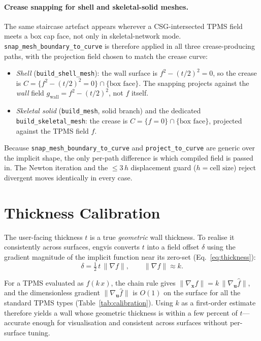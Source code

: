 \documentclass[11pt]{article}
\begin{document}
\paragraph{Crease snapping for shell and skeletal-solid meshes.}
The same staircase artefact appears wherever a CSG-intersected TPMS
field meets a box cap face, not only in skeletal-network mode.
\texttt{snap\_mesh\_boundary\_to\_curve} is therefore applied in all
three crease-producing paths, with the projection field chosen to
match the crease curve:
\begin{itemize}[leftmargin=2em]
  \item \emph{Shell} (\texttt{build\_shell\_mesh}): the wall surface is
        $f^2 - (t/2)^2 = 0$, so the crease is
        $C = \{f^2 - (t/2)^2 = 0\} \cap \{\text{box face}\}$.  The
        snapping projects against the \emph{wall} field
        $g_{\text{wall}} = f^2 - (t/2)^2$, not $f$ itself.
  \item \emph{Skeletal solid} (\texttt{build\_mesh}, solid branch) and
        the dedicated \texttt{build\_skeletal\_mesh}: the crease is
        $C = \{f = 0\} \cap \{\text{box face}\}$, projected against the
        TPMS field $f$.
\end{itemize}
Because \texttt{snap\_mesh\_boundary\_to\_curve} and
\texttt{project\_to\_curve} are generic over the implicit shape, the
only per-path difference is which compiled field is passed in.  The
Newton iteration and the $\le 3\,h$ displacement guard
($h = \text{cell size}$) reject divergent moves identically in every
case.

\section{Thickness Calibration}\label{sec:calibration}

The user-facing thickness $t$ is a true \emph{geometric} wall
thickness.  To realise it consistently across surfaces, engvis
converts $t$ into a field offset $\delta$ using the gradient magnitude
of the implicit function near its zero-set (Eq.~\ref{eq:thickness}):
\begin{equation}
  \delta = \tfrac{1}{2}\, t \, \|\nabla f\|,
  \qquad \|\nabla f\| \approx k.
\end{equation}

For a TPMS evaluated as $f(k\,x)$, the chain rule gives
$\|\nabla_{\mathbf{x}} f\| = k \,\|\nabla_{\mathbf{u}} \hat f\|$, and
the dimensionless gradient $\|\nabla_{\mathbf{u}}\hat f\|$ is $O(1)$
on the surface for all the standard TPMS types
(Table~\ref{tab:calibration}).  Using $k$ as a first-order
estimate therefore yields a wall whose geometric thickness is within a
few percent of $t$---accurate enough for visualisation and consistent
across surfaces without per-surface tuning.
\end{document}
